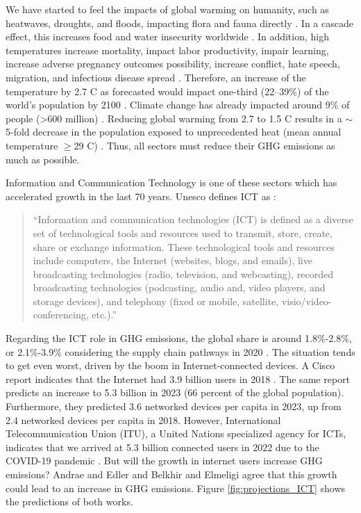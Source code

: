 We have started to feel the impacts of global warming on humanity, such as heatwaves, droughts, and floods, impacting flora and fauna directly \cite{masson2018global, change2022threat}. In a cascade effect, this increases food and water insecurity worldwide \cite{change2022threat, doi:10.1126/science.1239402}. In addition, high temperatures increase mortality, impact labor productivity, impair learning, increase adverse pregnancy outcomes possibility, increase conflict, hate speech, migration, and infectious disease spread \cite{lenton2023quantifying}. Therefore, an increase of the temperature by 2.7 \degree C as forecasted would impact one-third (22–39\%) of the world's population by 2100 \cite{lenton2023quantifying}. Climate change has already impacted around 9\% of people (>600 million) \cite{lenton2023quantifying}. Reducing global warming from 2.7 to 1.5 \degree C results in a $\sim$5-fold decrease in the population exposed to unprecedented heat (mean annual temperature $\geq$29 \degree C) \cite{lenton2023quantifying}. Thus, all sectors must reduce their GHG emissions as much as possible.

Information and Communication Technology is one of these sectors which has accelerated growth in the last 70 years. Unesco defines ICT as \cite{unesco2009guide}:

\begin{quote}
    ``Information and communication technologies (ICT) is defined as a diverse set of technological tools and resources used to transmit, store, create, share or exchange information. These technological tools and resources include computers, the Internet (websites, blogs, and emails), live broadcasting technologies (radio, television, and webcasting), recorded broadcasting technologies (podcasting, audio and, video players, and storage devices), and telephony (fixed or mobile, satellite, visio/video-conferencing, etc.).''
\end{quote}

Regarding the ICT role in GHG emissions, the global share is around 1.8\%-2.8\%, or 2.1\%-3.9\% considering the supply chain pathways in 2020 \cite{freitag2021climate}. The situation tends to get even worst, driven by the boom in Internet-connected devices. A Cisco report indicates that the Internet had 3.9 billion users in 2018 \cite{cisco2020cisco}. The same report predicts an increase to 5.3 billion in 2023 (66 percent of the global population). Furthermore, they predicted 3.6 networked devices per capita in 2023, up from 2.4 networked devices per capita in 2018. However, International Telecommunication Union (ITU), a United Nations specialized agency for ICTs, indicates that we arrived at 5.3 billion connected users in 2022 due to the COVID-19 pandemic \cite{ITU2022}. But will the growth in internet users increase GHG emissions? Andrae and Edler \cite{andrae2015global} and Belkhir and Elmeligi \cite{belkhir2018assessing} agree that this growth could lead to an increase in GHG emissions. Figure \ref{fig:projections_ICT} shows the predictions of both works.

